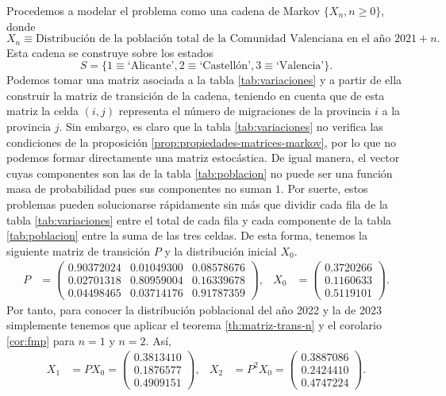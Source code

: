 \begin{ejemplo}
        Procedemos a modelar el problema como una cadena de Markov $\{X_n,n\geq0\}$, donde 
        $$X_n \equiv \text{Distribución de la población total de la Comunidad Valenciana en el año }2021+n.$$ 
        Esta cadena se construye sobre los estados 
        $$
        S=\{1\equiv\text{`Alicante'}, 2\equiv\text{`Castellón'},3\equiv\text{`Valencia'}\}.
        $$
        Podemos tomar una matriz asociada a la tabla \ref{tab:variaciones} y a partir de ella construir la matriz de transición de la cadena, teniendo en cuenta que de esta matriz la celda $(i,j)$ representa el número de migraciones de la provincia $i$ a la provincia $j$. Sin embargo, es claro que la tabla \ref{tab:variaciones} no verifica las condiciones de la proposición \ref{prop:propiedades-matrices-markov}, por lo que no podemos formar directamente una matriz estocástica. De igual manera, el vector cuyas componentes son las de la tabla \ref{tab:poblacion} no puede ser una función masa de probabilidad pues sus componentes no suman $1$. Por suerte, estos problemas pueden solucionarse rápidamente sin más que dividir cada fila de la tabla \ref{tab:variaciones} entre el total de cada fila y cada componente de la tabla \ref{tab:poblacion} entre la suma de las tres celdas. De esta forma, tenemos la siguiente matriz de transición $P$ y la distribución inicial $X_0$.
        \begin{align*}
            \label{eq:ejemplo-migraciones-matriz}
            P &= \begin{pmatrix}
                0.90372024 & 0.01049300 & 0.08578676 \\
                0.02701318 & 0.80959004 & 0.16339678 \\
                0.04498465 & 0.03714176 & 0.91787359
            \end{pmatrix}, & X_0 &= \begin{pmatrix}
                0.3720266 \\
                0.1160633 \\
                0.5119101
            \end{pmatrix}.
        \end{align*}
        Por tanto, para conocer la distribución poblacional del año 2022 y la de 2023 simplemente tenemos que aplicar el teorema \ref{th:matriz-trans-n} y el corolario \ref{cor:fmp} para $n=1$ y $n=2$. Así,
        \begin{align*}
            X_1 &= P X_0 = \begin{pmatrix}
                0.3813410 \\
                0.1876577 \\
                0.4909151
            \end{pmatrix}, & X_2 &= P^2 X_0 = \begin{pmatrix}
                0.3887086 \\
                0.2424410 \\
                0.4747224
            \end{pmatrix}.
        \end{align*}


\end{ejemplo}
